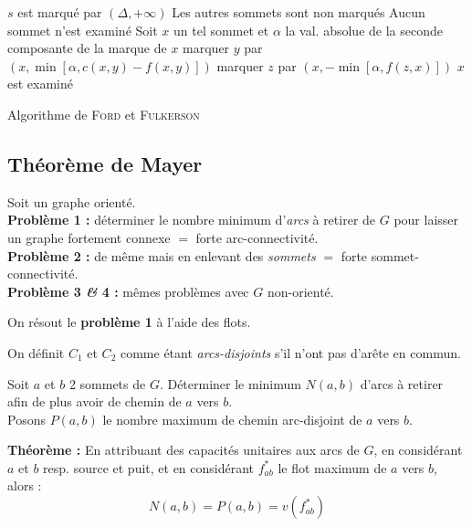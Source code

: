 \documentclass[a4paper, 8pt]{article}
\begin{document}
\begin{multicols*}{3}
\begin{center}
\begin{tikzpicture}[scale = 1.5]
\end{tikzpicture}
\end{center}

\begin{algorithm}[H]
 $s$ est marqué par $(\Delta,+\infty)$ \;
 Les autres sommets sont non marqués \;
 Aucun sommet n'est examiné \;
 {
 	 Soit $x$ un tel sommet et $\alpha$ la val. absolue de la seconde composante de la marque de $x$ \;
 	 {
 	 	{
 	 		marquer $y$ par \footnotesize{$\left(x,\min\left[\alpha,c(x,y)-f(x,y)\right]\right)$} \;
 	 	}
 	 }
 	 {
 	 	{
 	 		marquer $z$ par \footnotesize{$\left(x,-\min\left[\alpha,f(z,x)\right]\right)$} \;
 	 	}
 	 }
 	 $x$ est examiné \;
 }
 
 \caption{Algorithme de \textsc{Ford} et \textsc{Fulkerson}}
\end{algorithm}

\subsection*{Théorème de Mayer}
Soit \GXA un graphe orienté.\\
\textbf{Problème 1 :} déterminer le nombre minimum d'\textit{arcs} à retirer de $G$ pour laisser un graphe fortement connexe $=$ forte arc-connectivité.\\
\textbf{Problème 2 :} de même mais en enlevant des \textit{sommets} $=$ forte sommet-connectivité.\\
\textbf{Problème 3 \textit{\&} 4 :} mêmes problèmes avec $G$ non-orienté.

On résout le \textbf{problème 1} à l'aide des flots.

On définit $C_1$ et $C_2$ comme étant \emph{arcs-disjoints} s'il n'ont pas d'arête en commun.

\underline{} Soit $a$ et $b$ 2 sommets de $G$. Déterminer le minimum $N(a,b)$ d'arcs à retirer afin de plus avoir de chemin de $a$ vers $b$.\\
Posons $P(a,b)$ le nombre maximum de chemin arc-disjoint de $a$ vers $b$.

\smallskip
\textbf{Théorème :} En attribuant des capacités unitaires aux arcs de $G$, en considérant $a$ et $b$ resp. source et puit, et en considérant $f^*_{ab}$ le flot maximum de $a$ vers $b$, alors :
\[ N(a,b) = P(a,b) = v(f^*_{ab}) \]


\end{multicols*}
\end{document}
